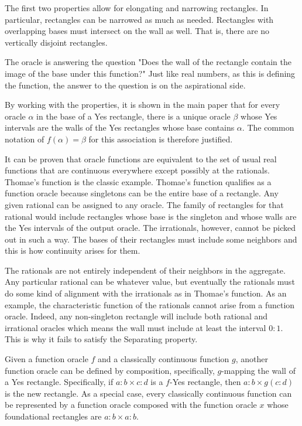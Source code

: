 \documentclass[12pt]{article}
\theoremstyle{remark}
\begin{document}
The first two properties allow for elongating and narrowing rectangles. In particular, rectangles can be narrowed as much as needed. Rectangles with overlapping bases must intersect on the wall as well. That is, there are no vertically disjoint rectangles. 

The oracle is answering the question "Does the wall of the rectangle contain the image of the base under this function?" Just like real numbers, as this is defining the function, the answer to the question is on the aspirational side. 

By working with the properties, it is shown in the  main paper that for every oracle $\alpha$ in the base of a Yes rectangle, there is a unique oracle $\beta$ whose Yes intervals are the walls of the Yes rectangles whose base contains $\alpha$. The common notation of $f(\alpha) = \beta$ for this association is therefore justified. 

It can be proven that oracle functions are equivalent to the set of usual real functions that are continuous everywhere except possibly at the rationals. Thomae's function is the classic example. Thomae's function qualifies as a function oracle because singletons can be the entire base of a rectangle. Any given rational can be assigned to any oracle. The family of rectangles for that rational would include rectangles whose base is the singleton and whose walls are the Yes intervals of the output oracle. The irrationals, however, cannot be picked out in such a way. The bases of their rectangles must include some neighbors and this is how continuity arises for them.

The rationals are not entirely independent of their neighbors in the aggregate. Any particular rational can be whatever value, but eventually the rationals must do some kind of alignment with the irrationals as in Thomae's function. As an example, the characteristic function of the rationals cannot arise from a function oracle. Indeed, any non-singleton rectangle will include both rational and irrational oracles which means the wall must include at least the interval $0:1$. This is why it fails to satisfy the Separating property. 

Given a function oracle $f$ and a classically continuous function $g$, another function oracle can be defined by composition, specifically, $g$-mapping the wall of a Yes rectangle. Specifically, if $a:b \times c:d$ is a $f$-Yes rectangle, then $a:b \times g(c:d)$ is the new rectangle. As a special case, every classically continuous function can be represented by a function oracle composed with the function oracle $x$ whose foundational rectangles are $a:b \times a:b$.
\end{document}
